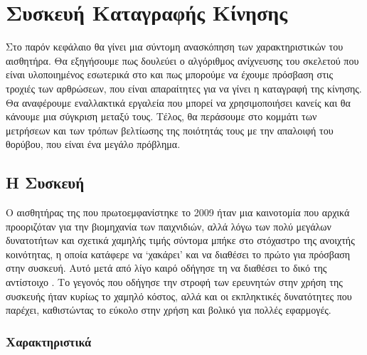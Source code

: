 \chapter{Συσκευή Καταγραφής Κίνησης}

Στο παρόν κεφάλαιο θα γίνει μια σύντομη ανασκόπηση των χαρακτηριστικών του αισθητήρα. Θα εξηγήσουμε πως δουλεύει ο αλγόριθμος ανίχνευσης του σκελετού που είναι υλοποιημένος εσωτερικά στο  και πως μπορούμε να έχουμε πρόσβαση στις τροχιές των αρθρώσεων, που είναι απαραίτητες για να γίνει η καταγραφή της κίνησης. Θα αναφέρουμε εναλλακτικά εργαλεία που μπορεί να χρησιμοποιήσει κανείς και θα κάνουμε μια σύγκριση μεταξύ τους. Τέλος, θα περάσουμε στο κομμάτι των μετρήσεων και των τρόπων βελτίωσης της ποιότητάς τους με την απαλοιφή του θορύβου, που είναι ένα μεγάλο πρόβλημα.

\section{\texorpdfstring{Η Συσκευή }{}}

Ο αισθητήρας της  που πρωτοεμφανίστηκε το 2009 ήταν μια καινοτομία που αρχικά προοριζόταν για την βιομηχανία των παιχνιδιών, αλλά λόγω των πολύ μεγάλων δυνατοτήτων και σχετικά χαμηλής τιμής σύντομα μπήκε στο στόχαστρο της ανοιχτής κοινότητας, η οποία κατάφερε να \lq χακάρει\rq \; και να διαθέσει το πρώτο  για πρόσβαση στην συσκευή. Αυτό μετά από λίγο καιρό οδήγησε τη  να διαθέσει το δικό της αντίστοιχο . Το γεγονός που οδήγησε την στροφή των ερευνητών στην χρήση της συσκευής ήταν κυρίως το χαμηλό κόστος, αλλά και οι εκπληκτικές δυνατότητες που παρέχει, καθιστώντας το εύκολο στην χρήση και βολικό για πολλές εφαρμογές.

\subsection{Χαρακτηριστικά}

